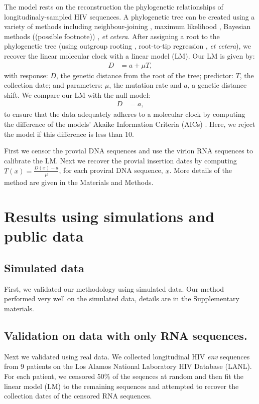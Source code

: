 \documentclass[12pt,onecolumn,twoside]{pnas-new}
\begin{document}
The model rests on the reconstruction the phylogenetic relationships of longitudinaly-sampled HIV sequences.
A phylogenetic tree can be created using a variety of methods including neighbour-joining \cite{Saitou87}, maximum likelihood \cite{fasttree,raxml}, Bayesian methods ((possible footnote)) \cite{beast,MRBAYES}, \emph{et cetera}.
After assigning a root to the phylogenetic tree (using outgroup rooting  \cite{Huelsenbeck02}, root-to-tip regression  \cite{Korber00}, \emph{et cetera}), we recover the linear molecular clock with a linear model (LM).
Our LM is given by:
\begin{align}
	D &= a + \mu T,\label{eq:glm}
\end{align}
with response: $D$, the genetic distance from the root of the tree; predictor: $T$, the collection date; and parameters: $\mu$, the mutation rate and $a$, a genetic distance shift.
We compare our LM with the null model:
\begin{align}
	D &= a,\label{eq:null}
\end{align}
to ensure that the data adequately adheres to a molecular clock by computing the difference of the models' Akaike Information Criteria (AICs) \cite{Akaike74}.
Here, we reject the model if this difference is less than 10.

First we censor the provial DNA sequences and use the virion RNA sequences to calibrate the LM.
Next we recover the provial insertion dates by computing $T(x) = \frac{D(x) - a}{\mu}$, for each proviral DNA sequence, $x$.
More details of the method are given in the Materials and Methods.

\section*{Results using simulations and public data}

\subsection*{Simulated data}

First, we validated our methodology using simulated data.
Our method performed very well on the simulated data, details are in the Supplementary materials.

\subsection*{Validation on data with only RNA sequences.}

Next we validated using real data.
We collected longitudinal HIV \emph{env} sequences from 9 patients on the Los Alamos National Laboratory HIV Database (LANL).
For each patient, we censored 50\% of the seqences at random and then fit the linear model (LM) to the remaining sequences and attempted to recover the collection dates of the censored RNA sequences.
\end{document}
